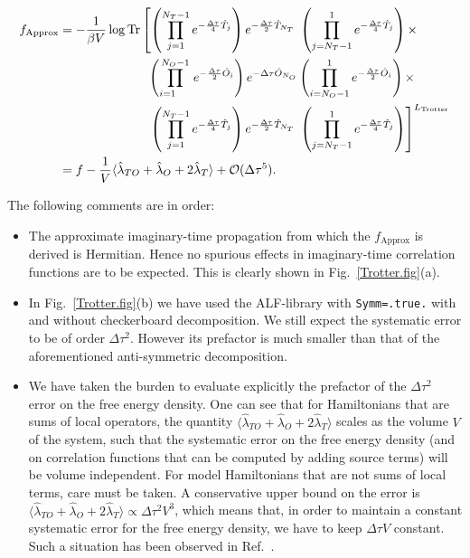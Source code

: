 \begin{align}
f_{\text{Approx} }  &=  
\begin{aligned}[t]
   -\frac{1}{\beta V } \log \mathop{\mathrm{Tr}} &\left[ \left(\prod_{j=1}^{N_T-1} e^{-\frac{\Delta \tau}{4} \hat{T}_j } \right)    e^{-\frac{\Delta \tau}{2} \hat{T}_{N_T} } \;   
   \left(  \prod_{j=N_T-1}^{1} e^{-\frac{\Delta \tau}{4} \hat{T}_j } \right)  \times   \right. \nonumber \\   
   &\;\;\left(\prod_{i=1\phantom{N_O}}^{N_O-1} e^{-\frac{\Delta \tau}{2} \hat{O}_i } \right)    e^{-\Delta \tau \hat{O}_{N_O} }    
     \left( \prod_{i=N_O-1}^{1} e^{-\frac{\Delta \tau}{2} \hat{O}_i } \right)  \times  \nonumber  \\
   &\;\;\left.   \left(\prod_{j=1}^{N_T-1} e^{-\frac{\Delta \tau}{4} \hat{T}_j } \right)    e^{-\frac{\Delta \tau}{2} \hat{T}_{N_T} }  \;  
   \left(  \prod_{j=N_T-1}^{1} e^{-\frac{\Delta \tau}{4} \hat{T}_j } \right)   
   \right]^{L_{\text{Trotter}}}  \nonumber 
\end{aligned}\\
   &= f    - \frac{1}{V}   \langle \hat{\lambda}_{TO} + \hat{\lambda}_{O} + 2 \hat{\lambda}_{T} \rangle  + \mathcal{O}( \Delta \tau ^5).
\end{align}

The following comments are in order:
\begin{itemize}
\item   The approximate imaginary-time propagation from which the $f_{\text{Approx} } $ is derived is Hermitian.  Hence no spurious effects in imaginary-time correlation functions are to be expected.  This is clearly shown in Fig.~\ref{Trotter.fig}(a).
\item  In Fig.~\ref{Trotter.fig}(b) we  have used the ALF-library with   \texttt{Symm=.true.}  with and without checkerboard decomposition.  We still expect the systematic error to be of order $\Delta \tau ^2 $.  However its prefactor is much smaller than that of the aforementioned  anti-symmetric decomposition.
\item   We have taken the burden to evaluate explicitly the prefactor of the $\Delta \tau ^2$ error on the free energy density.  One can  see that for Hamiltonians  that are sums of local  operators, the quantity $ \langle \hat{\lambda}_{TO} + \hat{\lambda}_{O} + 2 \hat{\lambda}_{T} \rangle  $ scales as the volume $V$  of the system, such that the systematic error on the free energy density (and on correlation functions that can be computed  by adding source terms)  will be  volume  independent. For model  Hamiltonians that are not sums of local terms, care must be taken.  A conservative upper bound on the  error is $ \langle \hat{\lambda}_{TO} + \hat{\lambda}_{O} + 2 \hat{\lambda}_{T} \rangle    \propto \Delta \tau^2 V^3 $, which means that, in order to maintain a constant systematic error for the free energy density, we have to keep $ \Delta \tau V $ constant. Such a situation has been observed in Ref.~\cite{WangZ20}.
\end{itemize}


